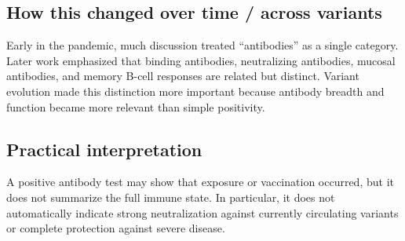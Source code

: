 \documentclass[12pt]{article}
\begin{document}
\subsection*{How this changed over time / across variants}
Early in the pandemic, much discussion treated ``antibodies'' as a single category. Later work emphasized that binding antibodies, neutralizing antibodies, mucosal antibodies, and memory B-cell responses are related but distinct. Variant evolution made this distinction more important because antibody breadth and function became more relevant than simple positivity.

\subsection*{Practical interpretation}
A positive antibody test may show that exposure or vaccination occurred, but it does not summarize the full immune state. In particular, it does not automatically indicate strong neutralization against currently circulating variants or complete protection against severe disease.
\end{document}
